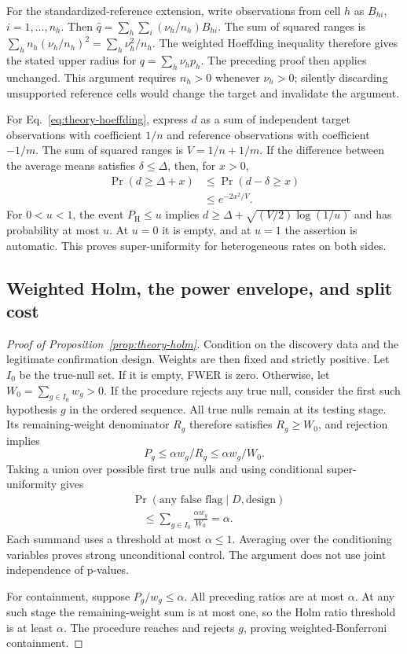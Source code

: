 For the standardized-reference extension, write observations from cell
$h$ as $B_{hi}$, $i=1,\ldots,n_h$. Then
$\widehat q=\sum_h\sum_i(\nu_h/n_h)B_{hi}$. The sum of squared ranges is
$\sum_h n_h(\nu_h/n_h)^2=\sum_h\nu_h^2/n_h$. The weighted Hoeffding inequality therefore
gives the stated upper radius for $q=\sum_h\nu_hp_h$. The preceding proof
then applies unchanged. This argument requires $n_h>0$ whenever
$\nu_h>0$; silently discarding unsupported reference cells would change
the target and invalidate the argument.

For Eq.~\eqref{eq:theory-hoeffding}, express $d$ as a sum of independent
target observations with coefficient $1/n$ and reference observations
with coefficient $-1/m$. The sum of squared ranges is $V=1/n+1/m$.
If the difference between the average means satisfies $\delta\le\Delta$, then, for
$x>0$,
\[
 \begin{aligned}
 \Pr(d\ge\Delta+x)&\le\Pr(d-\delta\ge x)\\
 &\le e^{-2x^2/V}.
 \end{aligned}
\]
For $0<u<1$, the event $P_{\mathrm H}\le u$ implies
$d\ge\Delta+\sqrt{(V/2)\log(1/u)}$ and has probability at most $u$.
At $u=0$ it is empty, and at $u=1$ the assertion is automatic. This proves
super-uniformity for heterogeneous rates on both sides.

\subsection{Weighted Holm, the power envelope, and split cost}

\begin{proof}[Proof of Proposition~\ref{prop:theory-holm}]
Condition on the discovery data and the legitimate confirmation design. Weights
are then fixed and strictly positive. Let $I_0$ be the true-null set. If
it is empty, FWER is zero. Otherwise, let $W_0=\sum_{g\in I_0}w_g>0$.
If the procedure rejects any true null, consider the first such
hypothesis $g$ in the ordered sequence. All true nulls remain at its
testing stage. Its remaining-weight denominator $R_g$ therefore satisfies
$R_g\ge W_0$, and rejection implies
\[
 P_g\le\alpha w_g/R_g\le\alpha w_g/W_0.
\]
Taking a union over possible first true nulls and using conditional
super-uniformity gives
\[
 \begin{aligned}
 &\Pr(\text{any false flag}\mid D,\text{design})\\
 &\quad\le\sum_{g\in I_0}\frac{\alpha w_g}{W_0}=\alpha.
 \end{aligned}
\]
Each summand uses a threshold at most $\alpha\le1$. Averaging over the
conditioning variables proves strong unconditional control. The argument does not use joint
independence of p-values.

For containment, suppose $P_g/w_g\le\alpha$. All preceding ratios are at
most $\alpha$. At any such stage the remaining-weight sum is at most
one, so the Holm ratio threshold is at least $\alpha$. The procedure
reaches and rejects $g$, proving weighted-Bonferroni containment.
\end{proof}

